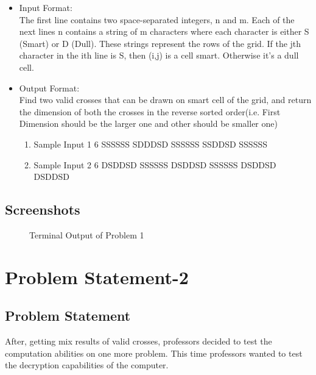 \documentclass[12pt]{article}
\begin{document}
			\begin{itemize}
				\item Input Format:\\The first line contains two space-separated integers, n and m.
				Each of the next lines n contains a string of m characters where each character is either S
				(Smart) or D (Dull). These strings represent the rows of the grid. If the jth character in the ith
				line is S, then (i,j) is a cell smart. Otherwise it's a dull cell.
				\item Output Format:\\ Find two valid crosses that can be drawn on smart cell of the grid, and return the dimension
				of both the crosses in the reverse sorted order(i.e. First Dimension should be the larger one
				and other should be smaller one)
				\begin{enumerate}
					\item Sample Input 1
					 6
					\subitem SSSSSS
					\subitem SDDDSD
					\subitem SSSSSS
					\subitem SSDDSD
					\subitem SSSSSS
					\item Sample Input 2
					 6
					\subitem DSDDS​D
					\subitem SSSSSS
					\subitem DSDDSD
					\subitem SSSSSS
					\subitem DSDDSD
					\subitem DSDDSD
				\end{enumerate}

			\end{itemize}

		\subsection{Screenshots}
		
			\begin{figure}[h!]
				\centering
				\caption{Terminal Output of Problem 1}
			\end{figure}

	\section{Problem Statement-2}
	
		\subsection{Problem Statement}
		After, getting mix results of valid crosses, professors decided to test the computation abilities
		on one more problem. This time professors wanted to test the decryption capabilities of the
		computer.
		
\end{document}
